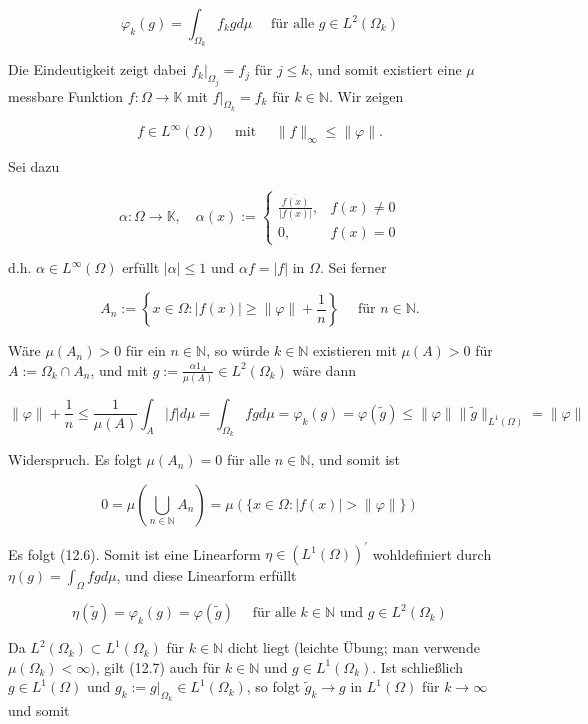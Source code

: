 \documentclass[10pt, letterpaper]{article}
\begin{document}
$$
\varphi_{k}(g)=\int_{\Omega_{k}} f_{k} g d \mu \quad \text { für alle } g \in L^{2}\left(\Omega_{k}\right)
$$

Die Eindeutigkeit zeigt dabei $\left.f_{k}\right|_{\Omega_{j}}=f_{j}$ für $j \leq k$, und somit existiert eine $\mu$ messbare Funktion $f: \Omega \rightarrow \mathbb{K}$ mit $\left.f\right|_{\Omega_{k}}=f_{k}$ für $k \in \mathbb{N}$. Wir zeigen

$$
f \in L^{\infty}(\Omega) \quad \text { mit } \quad\|f\|_{\infty} \leq\|\varphi\| .
$$

Sei dazu

$$
\alpha: \Omega \rightarrow \mathbb{K}, \quad \alpha(x):= \begin{cases}\frac{\overline{f(x)}}{|f(x)|}, & f(x) \neq 0 \\ 0, & f(x)=0\end{cases}
$$

d.h. $\alpha \in L^{\infty}(\Omega)$ erfüllt $|\alpha| \leq 1$ und $\alpha f=|f|$ in $\Omega$. Sei ferner

$$
A_{n}:=\left\{x \in \Omega:|f(x)| \geq\|\varphi\|+\frac{1}{n}\right\} \quad \text { für } n \in \mathbb{N} .
$$

Wäre $\mu\left(A_{n}\right)>0$ für ein $n \in \mathbb{N}$, so würde $k \in \mathbb{N}$ existieren mit $\mu(A)>0$ für $A:=\Omega_{k} \cap A_{n}$, und mit $g:=\frac{\alpha 1_{A}}{\mu(A)} \in L^{2}\left(\Omega_{k}\right)$ wäre dann

$$
\|\varphi\|+\frac{1}{n} \leq \frac{1}{\mu(A)} \int_{A}|f| d \mu=\int_{\Omega_{k}} f g d \mu=\varphi_{k}(g)=\varphi(\tilde{g}) \leq\|\varphi\|\|\tilde{g}\|_{L^{1}(\Omega)}=\|\varphi\|
$$

Widerspruch. Es folgt $\mu\left(A_{n}\right)=0$ für alle $n \in \mathbb{N}$, und somit ist

$$
0=\mu\left(\bigcup_{n \in \mathbb{N}} A_{n}\right)=\mu(\{x \in \Omega:|f(x)|>\|\varphi\|\})
$$

Es folgt (12.6). Somit ist eine Linearform $\eta \in\left(L^{1}(\Omega)\right)^{\prime}$ wohldefiniert durch $\eta(g)= \int_{\Omega} f g d \mu$, und diese Linearform erfüllt

$$
\eta(\tilde{g})=\varphi_{k}(g)=\varphi(\tilde{g}) \quad \text { für alle } k \in \mathbb{N} \text { und } g \in L^{2}\left(\Omega_{k}\right)
$$

Da $L^{2}\left(\Omega_{k}\right) \subset L^{1}\left(\Omega_{k}\right)$ für $k \in \mathbb{N}$ dicht liegt (leichte Übung; man verwende $\mu\left(\Omega_{k}\right)< \infty)$, gilt (12.7) auch für $k \in \mathbb{N}$ und $g \in L^{1}\left(\Omega_{k}\right)$. Ist schließlich $g \in L^{1}(\Omega)$ und $g_{k}:=\left.g\right|_{\Omega_{k}} \in L^{1}\left(\Omega_{k}\right)$, so folgt $\tilde{g}_{k} \rightarrow g$ in $L^{1}(\Omega)$ für $k \rightarrow \infty$ und somit
\end{document}
